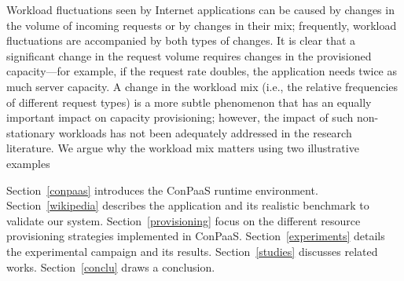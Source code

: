 Workload ﬂuctuations seen by Internet applications can be caused
by changes in the volume of incoming requests or by changes in
their mix; frequently, workload ﬂuctuations are accompanied by
both types of changes. It is clear that a signiﬁcant change in the
request volume requires changes in the provisioned capacity—for
example, if the request rate doubles, the application needs twice
as much server capacity. A change in the workload mix (i.e., the
relative frequencies of different request types) is a more subtle phenomenon that has an equally important impact on capacity provisioning; however, the impact of such non-stationary workloads has
not been adequately addressed in the research literature. We argue
why the workload mix matters using two illustrative examples




Section~\ref{conpaas} introduces the ConPaaS runtime environment. Section~\ref{wikipedia} describes the application and its realistic benchmark to validate our system. Section~\ref{provisioning} focus on the different resource provisioning strategies implemented in ConPaaS. Section~\ref{experiments} details the experimental campaign and its results. Section~\ref{studies} discusses related works. Section~\ref{conclu} draws a conclusion.

